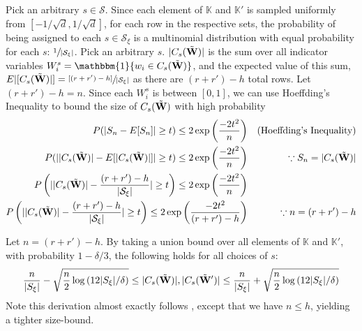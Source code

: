 Pick an arbitrary $s\in\mathcal{S}$. Since each element of $\mathbb{K}$ and $\mathbb{K}'$ is sampled uniformly from $[-1/\sqrt{d},1/\sqrt{d}]$, for each row in the respective sets, the probability of being assigned to each $s\in\mathcal{S}_\xi$ is a multinomial distribution with equal probability for each $s$: $\sfrac{1}{|\mathcal{S}_\xi|}$. Pick an arbitrary $s$.  $|C_s(\Tilde{{\mathbf{W}}})|$ is the sum over all indicator variables $W_i^s=\mathbbm{1}\{w_i\in C_s(\Tilde{\vW})\}$, and the expected value of this sum, $E|[C_s(\Tilde{{\mathbf{W}}})|] = \sfrac{[(r+r')-h]}{|\mathcal{S}_\xi|}$ as there are $(r+r')-h$ total rows. Let $(r+r')-h=n$. Since each $W_i^s$ is between $[0,1]$, we can use Hoeffding's Inequality to bound the size of $C_s(\Tilde{{\mathbf{W}}})$ with high probability
\begin{align}
    P(|S_n - E[S_n]| \geq t) \leq 2\exp\left(\frac{-2t^2}{n}\right) && (\text{Hoeffding's Inequality})\label{eq:hoeffding_cs} \\
    P(||C_s(\Tilde{{\mathbf{W}}})| - E[|C_s(\Tilde{{\mathbf{W}}})|]| \geq t) \leq 2\exp\left(\frac{-2t^2}{n}\right) && \because S_n = |C_s(\Tilde{{\mathbf{W}}})| \\
    P\left(||C_s(\Tilde{{\mathbf{W}}})| - \frac{(r+r')-h}{|\mathcal{S}_\xi|}| \geq t\right) \leq 2\exp\left(\frac{-2t^2}{n}\right) \\
    P\left(||C_s(\Tilde{{\mathbf{W}}})| - \frac{(r+r')-h}{|\mathcal{S}_\xi|}| \geq t\right) \leq 2\exp\left(\frac{-2t^2}{(r+r')-h}\right) && \because n=(r+r')-h\label{eq:cs_bound}
\end{align}

Let $n=(r+r')-h$. By taking a union bound over all elements of $\mathbb{K}$ and $\mathbb{K}'$, with probability $1-\delta/3$, the following holds for all choices of $s$:
\begin{equation}
    \frac{n}{|S_\xi|} - \sqrt{\frac{n}{2}\log{(12|S_\xi|/\delta)}} \leq |C_s(\Tilde{{\mathbf{W}}})|, |C_s(\Tilde{{\mathbf{W}}}')| \leq \frac{n}{|S_\xi|} + \sqrt{\frac{n}{2}\log{(12|S_\xi|/\delta)}}\label{eq:c_bound}
\end{equation}
Note this derivation almost exactly follows \cite{entezari2021role}, except that we have $n \leq h$, yielding a tighter size-bound. 

